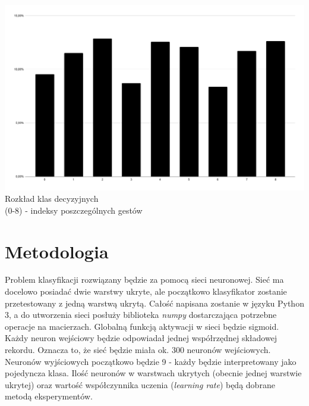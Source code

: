 \documentclass[a4paper,12pt]{article}
\begin{document}
\begin{center}
	\includegraphics[scale=0.25]{rozklad.png}
	\\\small Rozkład klas decyzyjnych
	\\(0-8) - indeksy poszczególnych gestów
\end{center}

\section{Metodologia}
\hspace{1cm}Problem klasyfikacji rozwiązany będzie za pomocą sieci neuronowej. Sieć ma docelowo posiadać dwie warstwy ukryte, ale początkowo klasyfikator zostanie przetestowany z jedną warstwą ukrytą. Całość napisana zostanie w języku Python 3, a do utworzenia sieci posłuży biblioteka \textsl{numpy} dostarczająca potrzebne operacje na macierzach. Globalną funkcją aktywacji w sieci będzie sigmoid. Każdy neuron wejściowy będzie odpowiadał jednej współrzędnej składowej rekordu. Oznacza to, że sieć będzie miała ok. 300 neuronów wejściowych. Neuronów wyjściowych początkowo będzie 9 - każdy będzie interpretowany jako pojedyncza klasa. Ilość neuronów w warstwach ukrytych (obecnie jednej warstwie ukrytej) oraz wartość współczynnika uczenia (\textsl{learning rate}) będą dobrane metodą eksperymentów.
\end{document}
